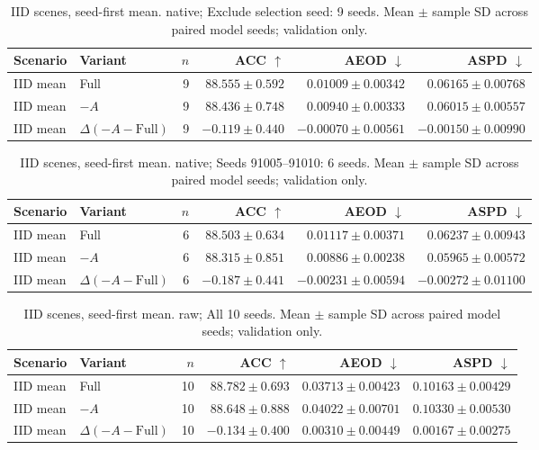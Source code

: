 \begin{table}[t]
\centering
\small
\caption{IID scenes, seed-first mean. native; Exclude selection seed: 9 seeds. Mean $\pm$ sample SD across paired model seeds; validation only.}
\begin{tabular}{llrrrr}
\toprule
Scenario & Variant & $n$ & ACC $\uparrow$ & AEOD $\downarrow$ & ASPD $\downarrow$ \\
\midrule
IID mean & Full & 9 & $88.555 \pm 0.592$ & $0.01009 \pm 0.00342$ & $0.06165 \pm 0.00768$ \\
IID mean & $-A$ & 9 & $88.436 \pm 0.748$ & $0.00940 \pm 0.00333$ & $0.06015 \pm 0.00557$ \\
IID mean & $\Delta(-A-\mathrm{Full})$ & 9 & $-0.119 \pm 0.440$ & $-0.00070 \pm 0.00561$ & $-0.00150 \pm 0.00990$ \\
\bottomrule
\end{tabular}
\end{table}

\begin{table}[t]
\centering
\small
\caption{IID scenes, seed-first mean. native; Seeds 91005–91010: 6 seeds. Mean $\pm$ sample SD across paired model seeds; validation only.}
\begin{tabular}{llrrrr}
\toprule
Scenario & Variant & $n$ & ACC $\uparrow$ & AEOD $\downarrow$ & ASPD $\downarrow$ \\
\midrule
IID mean & Full & 6 & $88.503 \pm 0.634$ & $0.01117 \pm 0.00371$ & $0.06237 \pm 0.00943$ \\
IID mean & $-A$ & 6 & $88.315 \pm 0.851$ & $0.00886 \pm 0.00238$ & $0.05965 \pm 0.00572$ \\
IID mean & $\Delta(-A-\mathrm{Full})$ & 6 & $-0.187 \pm 0.441$ & $-0.00231 \pm 0.00594$ & $-0.00272 \pm 0.01100$ \\
\bottomrule
\end{tabular}
\end{table}

\begin{table}[t]
\centering
\small
\caption{IID scenes, seed-first mean. raw; All 10 seeds. Mean $\pm$ sample SD across paired model seeds; validation only.}
\begin{tabular}{llrrrr}
\toprule
Scenario & Variant & $n$ & ACC $\uparrow$ & AEOD $\downarrow$ & ASPD $\downarrow$ \\
\midrule
IID mean & Full & 10 & $88.782 \pm 0.693$ & $0.03713 \pm 0.00423$ & $0.10163 \pm 0.00429$ \\
IID mean & $-A$ & 10 & $88.648 \pm 0.888$ & $0.04022 \pm 0.00701$ & $0.10330 \pm 0.00530$ \\
IID mean & $\Delta(-A-\mathrm{Full})$ & 10 & $-0.134 \pm 0.400$ & $0.00310 \pm 0.00449$ & $0.00167 \pm 0.00275$ \\
\bottomrule
\end{tabular}
\end{table}

